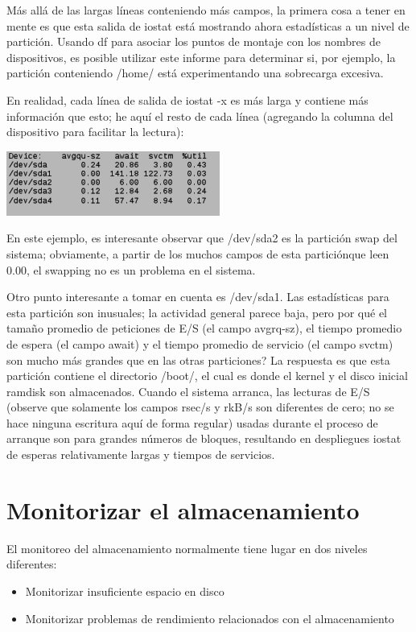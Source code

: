 \documentclass[12pt]{article}
\begin{document}
        
Más allá de las largas líneas conteniendo más campos, la primera cosa a tener en mente es que esta salida de iostat está mostrando ahora estadísticas a un nivel de partición. Usando df para asociar los puntos de montaje con los nombres de dispositivos, es posible utilizar este informe para determinar si, por ejemplo, la partición conteniendo /home/ está experimentando una sobrecarga excesiva.

En realidad, cada línea de salida de iostat -x es más larga y contiene más información que esto; he aquí el resto de cada línea (agregando la columna del dispositivo para facilitar la lectura):

\begin{center}
 \includegraphics{iostat3.png}
\end{center}

        
En este ejemplo, es interesante observar que /dev/sda2 es la partición swap del sistema; obviamente, a partir de los muchos campos de esta particiónque leen 0.00, el swapping no es un problema en el sistema.

Otro punto interesante a tomar en cuenta es /dev/sda1. Las estadísticas para esta partición son inusuales; la actividad general parece baja, pero por qué el tamaño promedio de peticiones de E/S (el campo avgrq-sz), el tiempo promedio de espera (el campo await) y el tiempo promedio de servicio (el campo svctm) son mucho más grandes que en las otras particiones? La respuesta es que esta partición contiene el directorio /boot/, el cual es donde el kernel y el disco inicial ramdisk son almacenados. Cuando el sistema arranca, las lecturas de E/S (observe que solamente los campos rsec/s y rkB/s son diferentes de cero; no se hace ninguna escritura aquí de forma regular) usadas durante el proceso de arranque son para grandes números de bloques, resultando en despliegues iostat de esperas relativamente largas y tiempos de servicios.


\section*{Monitorizar el almacenamiento}
El monitoreo del almacenamiento normalmente tiene lugar en dos niveles diferentes:

\begin{itemize}
\item Monitorizar insuficiente espacio en disco

\item Monitorizar problemas de rendimiento relacionados con el almacenamiento
\end{itemize}
\end{document}
